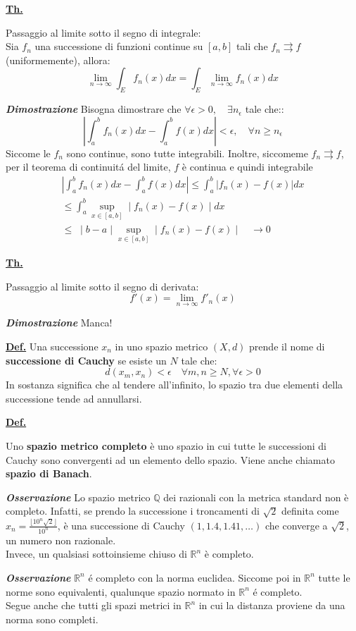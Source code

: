 \documentclass[a4paper,10pt]{article} %
\renewcommand{\b}[1]{%
    {\textbf{#1}}}
\newcommand{\ldef}[1]{%
    {\smallbreak\par\normalsize\textbf{\underline{Def.}} {#1} \smallbreak}}
\newcommand{\ltheorem}[1]{%
    {\smallbreak\par\normalsize\textbf{\underline{Th.}} {#1} \smallbreak\par}}
\newcommand{\ldim}[1]{%
    {\smallbreak\par\scriptsize\emph{\textbf{Dimostrazione}} {#1} \par}}
\newcommand{\loss}[1]{%
    {\smallbreak\par\scriptsize\emph{\textbf{Osservazione}} {#1} \par}}
\begin{document}
\begin{multicols}{2}
\ltheorem{Passaggio al limite sotto il segno di integrale:\\
    Sia ${f_n}$ una successione di funzioni continue su $[a,b]$ tali che $f_n \rightrightarrows f$ (uniformemente), allora:
    $$
        \lim_{n \rightarrow \infty} \int_E f_n(x)dx = \int_E \lim_{n \rightarrow \infty} f_n(x)dx 
    $$
    \ldim{
        Bisogna dimostrare che $ \forall \epsilon > 0, \quad \exists n_\epsilon$ tale che::
        $$
            \left| \int_a^b f_n(x)dx - \int_a^b f(x)dx \right| < \epsilon , \quad
            \forall n \geq n_\epsilon 
        $$
        Siccome le $f_n$ sono continue, sono tutte integrabili. Inoltre, siccomeme $f_n \rightrightarrows f$, per il teorema di continuit\'{a} del limite, $f$ \`{e} continua e quindi integrabile
        \begin{gather}
            \left| \int_a^b f_n(x)dx - \int_a^b f(x)dx \right| \leq \int_a^b \left| f_n(x) - f(x) \right| dx \\
            \leq \int_a^b \sup_{x\in [a,b]} \mid f_n(x) - f(x) \mid dx \\
            \leq  \; \mid b - a \mid \sup_{x\in [a,b]} \mid f_n(x) - f(x) \mid 
            \quad \rightarrow 0
        \end{gather}
    }
}

\ltheorem{Passaggio al limite sotto il segno di derivata:
    $$
        f'(x) = \lim_{n \rightarrow \infty} f'_n(x)
    $$
    \ldim{
        Manca!
    }
}

\ldef{
    Una successione ${x_n}$ in uno spazio metrico $(X,d)$ prende il nome di \b{successione di Cauchy} se esiste un $N$ tale che:
        $$
        d(x_m, x_n) < \epsilon \quad \forall m,n \geq N, \forall \epsilon > 0
        $$
    In sostanza significa che al tendere all'infinito, lo spazio tra due elementi della successione tende ad annullarsi.
}

\ldef{
    Uno \b{spazio metrico completo} è uno spazio in cui tutte le successioni di Cauchy sono convergenti ad un elemento dello spazio. 
    Viene anche chiamato \b{spazio di Banach}.
    \loss{
        Lo spazio metrico $\mathbb{Q}$ dei razionali con la metrica standard non è completo. Infatti, se prendo la successione i troncamenti di $\sqrt{2}$ definita come $x_n = \frac{\lfloor 10^n \sqrt{2}\rfloor}{10^n}$, è una successione di Cauchy $(1, 1.4, 1.41, \dots)$ che converge a $\sqrt{2}$, un numero non razionale.\\
        Invece, un qualsiasi sottoinsieme chiuso di $\mathbb{R}^n$ è completo.
    }
    \loss{
        $\mathbb{R}^n$ \'{e} completo con la norma euclidea. Siccome poi in $\mathbb{R}^n$ tutte le norme sono equivalenti, qualunque spazio normato in $\mathbb{R}^n$ \'{e} completo. \\
        Segue anche che tutti gli spazi metrici in $\mathbb{R}^n$ in cui la distanza proviene da una norma sono completi.
    }
}


\end{multicols}
\end{document}
